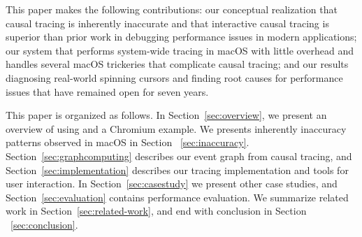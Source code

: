 This paper makes the following contributions: our conceptual realization that
causal tracing is inherently inaccurate and that interactive causal tracing is
superior than prior work in debugging performance issues in modern applications;
our system \xxx that performs system-wide tracing in macOS with little overhead
and handles several macOS trickeries that complicate causal tracing; and our
results diagnosing real-world spinning cursors and finding root causes for
performance issues that have remained open for seven years.

This paper is organized as follows. In Section~\ref{sec:overview}, we present
an overview of using \xxx and a Chromium example.
We presents inherently inaccuracy patterns observed in macOS in Section
~\ref{sec:inaccuracy}.
Section~\ref{sec:graphcomputing} describes our event graph from causal tracing,
and Section~\ref{sec:implementation} describes our
tracing implementation and tools for user interaction.
In Section~\ref{sec:casestudy} we present other case
studies, and Section~\ref{sec:evaluation} contains performance evaluation.
We summarize related work in Section~\ref{sec:related-work}, and end with
conclusion in Section ~\ref{sec:conclusion}.
